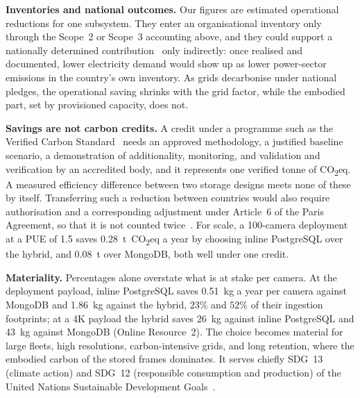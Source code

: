\documentclass[pdflatex,sn-basic]{sn-jnl}%
\begin{document}
\textbf{Inventories and national outcomes.} Our figures are estimated operational reductions for one subsystem. They enter an organisational inventory only through the Scope~2 or Scope~3 accounting above, and they could support a nationally determined contribution~\citep{unfccc_paris_agreement} only indirectly: once realised and documented, lower electricity demand would show up as lower power-sector emissions in the country's own inventory. As grids decarbonise under national pledges, the operational saving shrinks with the grid factor, while the embodied part, set by provisioned capacity, does not.

\textbf{Savings are not carbon credits.} A credit under a programme such as the Verified Carbon Standard~\citep{verra_vcs_standard} needs an approved methodology, a justified baseline scenario, a demonstration of additionality, monitoring, and validation and verification by an accredited body, and it represents one verified tonne of CO\textsubscript{2}eq. A measured efficiency difference between two storage designs meets none of these by itself. Transferring such a reduction between countries would also require authorisation and a corresponding adjustment under Article~6 of the Paris Agreement, so that it is not counted twice~\citep{unfccc_paris_agreement,unfccc_decision_2cma3}. For scale, a 100-camera deployment at a PUE of 1.5 saves 0.28~t~CO\textsubscript{2}eq a year by choosing inline PostgreSQL over the hybrid, and 0.08~t over MongoDB, both well under one credit.

\textbf{Materiality.} Percentages alone overstate what is at stake per camera. At the deployment payload, inline PostgreSQL saves 0.51~kg a year per camera against MongoDB and 1.86~kg against the hybrid, $23\%$ and $52\%$ of their ingestion footprints; at a 4K payload the hybrid saves 26~kg against inline PostgreSQL and 43~kg against MongoDB (Online Resource~2). The choice becomes material for large fleets, high resolutions, carbon-intensive grids, and long retention, where the embodied carbon of the stored frames dominates. It serves chiefly SDG~13 (climate action) and SDG~12 (responsible consumption and production) of the United Nations Sustainable Development Goals~\citep{un_sdg}.
\end{document}
